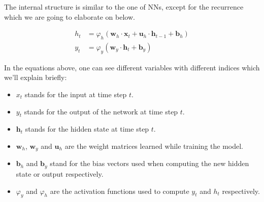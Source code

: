 The internal structure is similar to the one of NNs, except for the recurrence which we are going to elaborate on below.

\begin{equation}
\begin{split}
h_t & = \varphi_h(\mathbf{w}_h \cdot \mathbf{x}_t + \mathbf{u}_h \cdot \mathbf{h}_{t-1} + \mathbf{b}_h) \\
y_t & = \varphi_y(\mathbf{w}_y \cdot \mathbf{h}_t + \mathbf{b}_y)
\end{split}
\label{fundamentals:rnn:forward_equation:hidden}
\end{equation}

In the equations above, one can see different variables with different indices which we'll explain briefly:

\begin{itemize}[noitemsep]
	\item $x_t$ stands for the input at time step $t$.
	\item $y_t$ stands for the output of the network at time step $t$.
	\item $\mathbf{h}_t$ stands for the hidden state at time step $t$.
	\item $\mathbf{w}_h$, $\mathbf{w}_y$ and $\mathbf{u}_h$ are the weight matrices learned while training the model.
	\item $\mathbf{b}_h$ and $\mathbf{b}_y$ stand for the bias vectors used when computing the new hidden state or output respectively.
	\item $\varphi_y$ and $\varphi_h$ are the activation functions used to compute $y_t$ and $h_t$ respectively.
\end{itemize}


